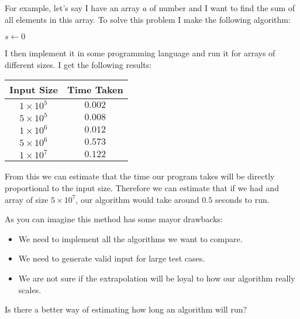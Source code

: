 \documentclass{article}
\begin{document}
For example, let's say I have an array $a$ of number and I want to find the sum of all elements in this array. To solve this problem I make the following algorithm:

\begin{algorithm}
	\SetAlgoNoEnd
	$s \gets 0$\;
\end{algorithm}

I then implement it in some programming language and run it for arrays of different sizes. I get the following results:

\begin{center}
\begin{tabular}{ c | c }
	Input Size & Time Taken \\ 
	\hline
	$1 \times 10^5$ & $0.002$ \\  
	$5 \times 10^5$ & $0.008$ \\  
	$1 \times 10^6$ & $0.012$ \\  
	$5 \times 10^6$ & $0.573$ \\  
	$1 \times 10^7$ & $0.122$ \\  
\end{tabular}
\end{center}

From this we can estimate that the time our program takes will be directly proportional to the input size. Therefore we can estimate that if we had and array of size $5\times10^7$, our algorithm would take around $0.5$ seconds to run.

As you can imagine this method has some mayor drawbacks:
\begin{itemize}
	\item We need to implement all the algorithms we want to compare.
	\item We need to generate valid input for large test cases.
	\item We are not sure if the extrapolation will be loyal to how our algorithm really scales.
\end{itemize}

Is there a better way of estimating how long an algorithm will run?
\end{document}
